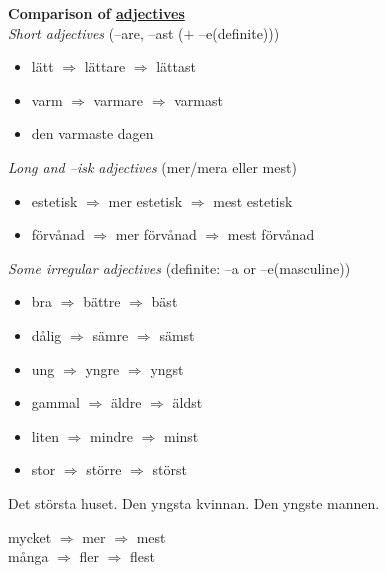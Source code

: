 
\begin{flushleft}
    \textbf{Comparison of \underline{adjectives}} \\
    \textsl{Short adjectives} (--are, --ast ($+$ --e(definite)))
    \begin{itemize}
        \item lätt $\Rightarrow$ lättare $\Rightarrow$ lättast
        \item varm $\Rightarrow$ varmare $\Rightarrow$ varmast
        \item den varmaste dagen
    \end{itemize}

    \textsl{Long and --isk adjectives} (mer/mera eller mest)
    \begin{itemize}
        \item estetisk $\Rightarrow$ mer estetisk $\Rightarrow$ mest estetisk
        \item förvånad $\Rightarrow$ mer förvånad $\Rightarrow$ mest förvånad
    \end{itemize}

    \textsl{Some irregular adjectives} (definite: --a or --e(masculine))
    \begin{itemize}
        \item bra $\Rightarrow$ bättre $\Rightarrow$ bäst
        \item dålig $\Rightarrow$ sämre $\Rightarrow$ sämst
        \item ung $\Rightarrow$ yngre $\Rightarrow$ yngst
        \item gammal $\Rightarrow$ äldre $\Rightarrow$ äldst
        \item liten $\Rightarrow$ mindre $\Rightarrow$ minst
        \item stor $\Rightarrow$ större $\Rightarrow$ störst
    \end{itemize}
    Det största huset. Den yngsta kvinnan. Den yngste mannen.

    mycket $\Rightarrow$ mer $\Rightarrow$ mest \\
    många $\Rightarrow$ fler $\Rightarrow$ flest
\end{flushleft}

